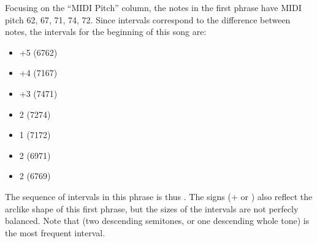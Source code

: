 \documentclass[letterpaper,10pt,english]{sphinxmanual}
\begin{document}
Focusing on the “MIDI Pitch” column, the notes in the first phrase have MIDI pitch 62, 67, 71, 74, 72. Since intervals correspond to the difference between notes, the intervals for the beginning of this song are:
\begin{itemize}
\item {} 
+5 (67\sphinxhyphen{}62)

\item {} 
+4 (71\sphinxhyphen{}67)

\item {} 
+3 (74\sphinxhyphen{}71)

\item {} 
\sphinxhyphen{}2 (72\sphinxhyphen{}74)

\item {} 
\sphinxhyphen{}1 (71\sphinxhyphen{}72)

\item {} 
\sphinxhyphen{}2 (69\sphinxhyphen{}71)

\item {} 
\sphinxhyphen{}2 (67\sphinxhyphen{}69)

\end{itemize}

The sequence of intervals in this phrase is thus . The signs (+ or \sphinxhyphen{}) also reflect the arc\sphinxhyphen{}like shape of this first phrase, but the sizes of the intervals are not perfecly balanced. Note that  (two descending semitones, or one descending whole tone) is the most frequent interval.

{
\begin{sphinxVerbatim}[commandchars=\\\{\}]
\llap{\color{nbsphinxin}[110]:\,\hspace{\fboxrule}\hspace{\fboxsep}}  \PYG{p}{[}             \PYG{p}{[}\PYG{p}{]} \PYG{p}{[}\PYG{p}{]}\PYG{p}{[}\PYG{p}{]} \PYG{p}{]}
  
  
\end{sphinxVerbatim}
}
\end{document}
